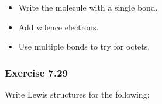 \documentclass[11pt]{article}
\begin{document}
\begin{itemize}
    \item Write the molecule with a single bond. \\
    \item Add valence electrons. \\
    \item Use multiple bonds to try for octets. \\
\end{itemize}

\subsubsection{Exercise 7.29}
Write Lewis structures for the following:
\end{document}

